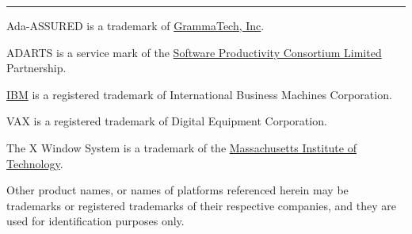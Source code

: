 ${}${}
\vfill
\noindent
\rule{3cm}{0.5pt}
\vspace{0.5em}

\footnotesize{
\noindent
Ada-ASSURED is a trademark of \href{http://www.grammatech.com}{GrammaTech, Inc}.

\noindent
ADARTS  is a service mark of the
\href{http://www.software.org}{Software Productivity Consortium Limited}
Partnership.

\noindent
\href{http://www.ibm.com}{IBM} is a registered trademark of International
 Business Machines Corporation.

\noindent
VAX is a registered trademark of Digital Equipment Corporation.

\noindent
The X Window System is a trademark of the
\href{http://www.mit.edu}{Massachusetts Institute of Technology}.

\noindent
Other product names, or names of platforms referenced herein may be
trademarks or registered trademarks of their respective
companies, and they are used for identification purposes only.
}
